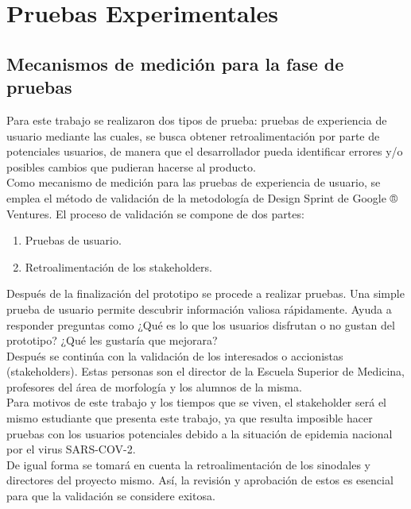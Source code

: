 \chapter{Pruebas Experimentales}

\section{Mecanismos de medición para la fase de pruebas}
Para este trabajo se realizaron dos tipos de prueba: pruebas de experiencia de usuario mediante las cuales, se busca obtener retroalimentación por parte de potenciales usuarios, de manera que el desarrollador pueda identificar errores y/o posibles cambios que pudieran hacerse al producto. \\

Como mecanismo de medición para las pruebas de experiencia de usuario, se emplea el método de validación de la metodología de Design Sprint de Google ® Ventures\cite{web16}. El proceso de validación se compone de dos partes:\\
\begin{enumerate}
    \item Pruebas de usuario.
    \item Retroalimentación de los stakeholders.
\end{enumerate}
Después de la finalización del prototipo se procede a realizar pruebas. Una simple prueba de usuario permite descubrir información valiosa rápidamente. Ayuda a responder preguntas como ¿Qué es lo que los usuarios disfrutan o no gustan del prototipo? ¿Qué les gustaría que mejorara? \\

Después se continúa con la validación de los interesados o accionistas (stakeholders). Estas personas son el director de la Escuela Superior de Medicina, profesores del área de morfología y los alumnos de la misma. \\

Para motivos de este trabajo y los tiempos que se viven, el stakeholder será el mismo estudiante que presenta este trabajo, ya que resulta imposible hacer pruebas con los usuarios potenciales debido a la situación de epidemia nacional por el virus SARS-COV-2.\\

De igual forma se tomará en cuenta la retroalimentación de los sinodales y directores del proyecto mismo. Así, la revisión y aprobación de estos es esencial para que la validación se considere exitosa.\\

